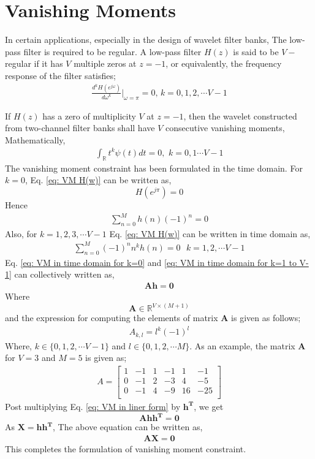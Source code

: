 \section{Vanishing Moments}
\label{sec: VM}
In certain applications, especially in the design of wavelet filter
banks, The low-pass filter is required to be regular. A low-pass filter
$H(z)$ is said to be $V-$regular if it has $V$ multiple zeros
at $z=-1$, or equivalently, the frequency response of the filter
satisfies;
\begin{eqnarray}
\label{eq: VM H(w)}
 \frac{d^{k}H(e^{j\omega})}{d\omega^{k}}\Bigg|_{\omega=\pi}=0,\, k=0,1,2,\cdots V-1 
\end{eqnarray}

If $H(z)$ has a zero of multiplicity $V$ at $z=-1$, then the
wavelet constructed from two-channel filter banks shall have $V$
consecutive vanishing moments, Mathematically,
\begin{eqnarray}
\label{eq: regular PSI(t) }
\int_{\mathbb{R}}t^{k}\psi(t)dt=0,\,\, k=0,1\cdots V-1
\end{eqnarray} 
The vanishing moment constraint has been formulated in the time domain. For $k=0$, Eq. \ref{eq: VM H(w)} can be written as,
$$H(e^{j\pi}) = 0$$
Hence
\begin{eqnarray}
\label{eq: VM in time domain for k=0}
\sum_{n=0}^{M} h(n)(-1)^n = 0
\end{eqnarray}
Also, for $k=1,2,3,\cdots V-1$  Eq. \ref{eq: VM H(w)} can be written in time domain as,
\begin{eqnarray}
\label{eq: VM in time domain for k=1 to V-1}
\sum_{n=0}^{M}(-1)^n{n^k}h(n)=0 \,\,\,\, k = 1,2, \cdots V-1
\end{eqnarray} 
Eq. \ref{eq: VM in time domain for k=0} and \ref{eq: VM in time domain for k=1 to V-1} can collectively written as,
\begin{eqnarray}
\label{eq: VM in liner form}
\mathbf{Ah = 0}
\end{eqnarray}
Where $$\mathbf{A} \in \mathbb{R}^{V \times (M+1)}$$  and the expression for computing the elements of matrix $\mathbf{A}$ is given as follows;
\begin{eqnarray}
\label{eq: VM Matrix}
A_{k,l} = {l^k}(-1)^l
\end{eqnarray}
Where, $k \in \{0,1,2, \cdots V-1\}$ and $l \in \{0,1,2,\cdots M\}$.
As an example, the matrix $\mathbf{A}$ for $V=3$ and $M=5$ is given as;
\begin{eqnarray}
\label{eq: Matrix A for V=3 and M=5}
A = \left[
\begin{array}{ccccccc}
    1     & -1    & 1     & -1    & 1     & -1 \\
    0     & -1    & 2     & -3    & 4     & -5 \\
    0     & -1    & 4     & -9    & 16    & -25 \\
\end{array}
\right]
\end{eqnarray}
Post multiplying Eq. \ref{eq: VM in liner form} by $\mathbf{h^T}$, we get
$$ \mathbf{Ah{h^T}=0}$$
As $ \mathbf{X = h{h^T}}$, The above equation can be written as,
\begin{eqnarray}
\label{eq: VM in SDP form}
\mathbf{AX = 0}
\end{eqnarray}
This completes the formulation of vanishing moment constraint.
